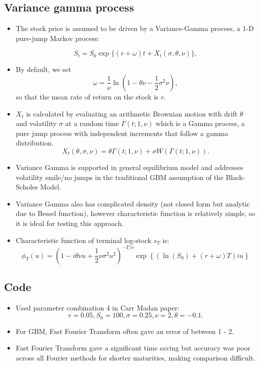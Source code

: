 \documentclass[11pt]{article}
\begin{document}
			\subsection{Variance gamma process}
				\begin{itemize}
					\item	The stock price is assumed to be driven by a Variance-Gamma process, a 1-D pure-jump Markov process:
					
					\[	S_t = S_0\exp\{	
										(r + \omega) t + X_{t}(\sigma, \theta, \nu)
											\},
							\] 
					\item	By default, we set 
					\[	\omega = \frac{1}{\nu} \ln(1 - \theta \nu - \frac{1}{2}\sigma^2\nu),
								\]
					so that the mean rate of return on the stock is \( r \).
					\item \( X_t \) is calculated by evaluating an arithmetic Brownian motion with drift \( \theta \) and volatility \( \sigma \) at a random time \( \Gamma(t; 1,\nu) \) which is a Gamma process, a pure jump process with independent increments that follow a gamma distribution.
					\[	X_t(\theta, \sigma, \nu) = \theta \Gamma(t;1, \nu) + \sigma W(\Gamma(t; 1, \nu)).
							\]
					\item Variance Gamma is supported in general equilibrium model and addresses volatility smile/no jumps in the traditional GBM assumption of the Black-Scholes Model.
					\item Variance Gamma also has complicated density (not closed form but analytic due to Bessel function), however characteristic function is relatively simple, so it is ideal for testing this approach.
					\item Characteristic function of terminal log-stock \( s_T \) is:
					\[	\phi_{T}(u) = (1 - i\theta\nu u + \frac{1}{2}\nu\sigma^2 u^2)^{-T/\nu}
								 		\exp\left\{
								 			(
								 				\ln(S_0) + (r + \omega)T
								 			)
								 			iu
											\right\}
								\]
				\end{itemize}
			\subsection{Code}
				\begin{itemize}
					\item Used parameter combination 4 in Carr Madan paper:
					\[	r = 0.05, S_0 = 100, \sigma = 0.25, \nu = 2, \theta = -0.1.
							\]
					\item For GBM, Fast Fourier Transform often gave an error of between 1 - 2.
					\item Fast Fourier Transform gave a significant time saving but accuracy was poor across all Fourier methods for shorter maturities, making comparison difficult.	 
				\end{itemize}
\end{document}
